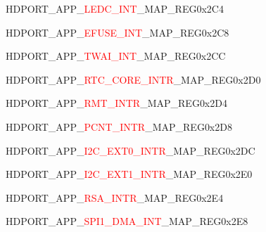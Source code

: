 \vspace{-3em}
\begin{register}{H}{DPORT\_APP\_\textcolor{red}{LEDC\_INT}\_MAP\_REG}{0x2C4}\label{regdesc:APPLEDCINTMAPREG}
\end{register}
\vspace{-3em}
\begin{register}{H}{DPORT\_APP\_\textcolor{red}{EFUSE\_INT}\_MAP\_REG}{0x2C8}\label{regdesc:APPEFUSEINTMAPREG}
\end{register}
\vspace{-3em}
\begin{register}{H}{DPORT\_APP\_\textcolor{red}{TWAI\_INT}\_MAP\_REG}{0x2CC}\label{regdesc:APPCANINTMAPREG}
\end{register}
\vspace{-3em}
\begin{register}{H}{DPORT\_APP\_\textcolor{red}{RTC\_CORE\_INTR}\_MAP\_REG}{0x2D0}\label{regdesc:APPRTCCOREINTRMAPREG}
\end{register}
\vspace{-3em}
\begin{register}{H}{DPORT\_APP\_\textcolor{red}{RMT\_INTR}\_MAP\_REG}{0x2D4}\label{regdesc:APPRMTINTRMAPREG}
\end{register}
\vspace{-3em}
\begin{register}{H}{DPORT\_APP\_\textcolor{red}{PCNT\_INTR}\_MAP\_REG}{0x2D8}\label{regdesc:APPPCNTINTRMAPREG}
\end{register}
\vspace{-3em}
\begin{register}{H}{DPORT\_APP\_\textcolor{red}{I2C\_EXT0\_INTR}\_MAP\_REG}{0x2DC}\label{regdesc:APPI2CEXT0INTRMAPREG}
\end{register}
\vspace{-3em}
\begin{register}{H}{DPORT\_APP\_\textcolor{red}{I2C\_EXT1\_INTR}\_MAP\_REG}{0x2E0}\label{regdesc:APPI2CEXT1INTRMAPREG}
\end{register}
\vspace{-3em}
\begin{register}{H}{DPORT\_APP\_\textcolor{red}{RSA\_INTR}\_MAP\_REG}{0x2E4}\label{regdesc:APPRSAINTRMAPREG}
\end{register}
\vspace{-3em}
\begin{register}{H}{DPORT\_APP\_\textcolor{red}{SPI1\_DMA\_INT}\_MAP\_REG}{0x2E8}\label{regdesc:APPSPI1DMAINTMAPREG}
\end{register}
